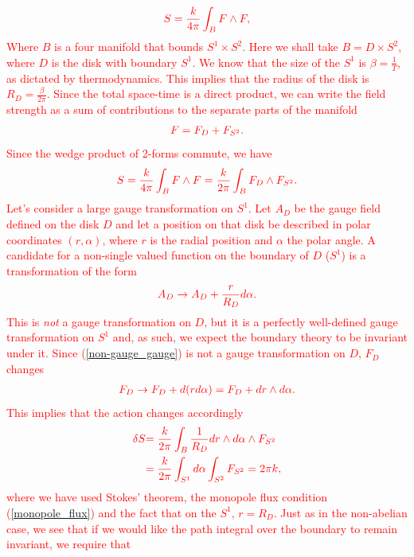 \begin{align}
    \textcolor{red}{S=\frac{k}{4 \pi} \int_{B} F\wedge F,}
\end{align}
 \textcolor{red}{ Where $B$ is a four manifold that bounds $S^1 \times S^2$. Here we shall take $B= D\times S^2$, where $D$ is the disk with boundary $S^1$. We know that the size of the $S^1$ is $\beta= \frac{1}{T}$, as dictated by thermodynamics. This implies that the radius of the disk is $R_D=\frac{\beta}{2\pi}$. Since the total space-time is a direct product, we can write the field strength as a sum of contributions to the separate parts of the manifold} 
\begin{align}
    \textcolor{red}{F= F_D +F_{S^2}.}
\end{align}
 \textcolor{red}{Since the wedge product of 2-forms commute, we have }
\begin{align}
    \textcolor{red}{   S = \frac{k}{4\pi}\int_B F\wedge F = \frac{k}{2\pi} \int_B F_{D} \wedge F_{S^2}.}
\end{align}
\textcolor{red}{Let's consider a large gauge transformation on $S^1$. Let $A_D$ be the gauge field defined on the disk $D$ and let a position on that disk be described in polar coordinates $(r, \alpha)$, where $r$ is the radial position and $\alpha$ the polar angle. A candidate for a non-single valued function on the boundary of $D$ ($S^1$) is a transformation of the form }
\begin{align}
    \textcolor{red}{A_D \rightarrow A_D + \frac{r}{R_D} d\alpha. \label{non-gauge_gauge}}
\end{align}
\textcolor{red}{This is \textit{not} a gauge transformation on $D$, but it is a perfectly well-defined gauge transformation on $S^1$ and, as such, we expect the boundary theory to be invariant under it. Since (\ref{non-gauge_gauge}) is not a gauge transformation on $D$, $F_D$ changes}
\begin{align}
    \textcolor{red}{F_D \rightarrow F_D + d (r d\alpha) =F_D + dr \wedge d\alpha.}
\end{align}
 \textcolor{red}{This implies that the action changes accordingly }
\begin{align}
    \textcolor{red}{\delta S }& \textcolor{red}{= \frac{k}{2\pi} \int_B \frac{1}{R_D} dr \wedge d\alpha \wedge F_{S^2}}\\
    & \textcolor{red}{= \frac{k}{2\pi} \int_{S^1}  d\alpha \int_{S^2} F_{S^2}=2\pi k,}
\end{align}
 \textcolor{red}{where we have used Stokes' theorem, the monopole flux condition (\ref{monopole_flux}) and the fact that on the $S^1$, $r=R_D$. Just as in the non-abelian case, we see that if we would like the path integral over the boundary to remain invariant, we require that }
